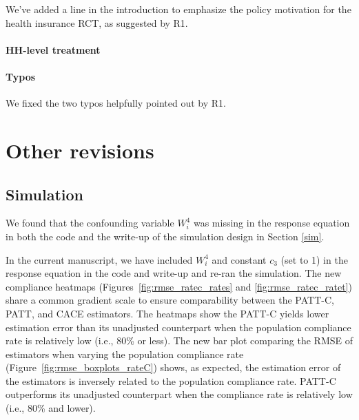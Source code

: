 \documentclass[hidelinks,12pt,letterpaper]{article}
\begin{document}
We've added a line  in the introduction to emphasize the policy motivation for the health insurance RCT, as suggested by R1. 

\paragraph*{HH-level treatment}




\paragraph*{Typos}
We fixed the two typos helpfully pointed out by R1. 

\section{Other revisions}

\subsection{Simulation}
We found that the confounding variable $W^{4}_i$ was missing in the response equation in both the code and the write-up of the simulation design in Section \ref{sim}. 

In the current manuscript, we have included $W^{4}_i$ and constant $c_3$ (set to 1) in the response equation in the code and write-up and re-ran the simulation. The new compliance heatmaps (Figures~\ref{fig:rmse_ratec_rates} and \ref{fig:rmse_ratec_ratet}) share a common gradient scale to ensure comparability between the PATT-C, PATT, and CACE estimators. The heatmaps show the PATT-C yields lower estimation error than its unadjusted counterpart when the population compliance rate is relatively low (i.e., 80\% or less). The new bar plot comparing the RMSE of estimators when varying the population compliance rate (Figure~\ref{fig:rmse_boxplots_rateC}) shows, as expected, the estimation error of the estimators is inversely related to the population compliance rate. PATT-C outperforms its unadjusted counterpart when the compliance rate is relatively low (i.e., 80\% and lower). 


\printbibliography
\end{document}
